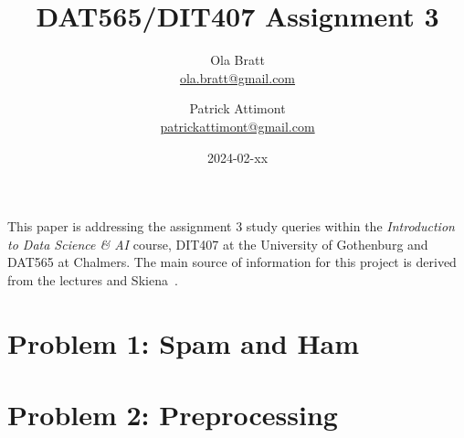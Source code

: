 \documentclass[a4paper]{article}
\begin{document}
\author{Ola Bratt \\
  \href{mailto:ola.bratt@gmail.com}{ola.bratt@gmail.com}
  \and
  Patrick Attimont \\
  \href{patrickattimont@gmail.com}{patrickattimont@gmail.com}
}

\title{DAT565/DIT407 Assignment 3}
\date{2024-02-xx}

\maketitle

This paper is addressing the assignment 3 study queries within the \emph{Introduction to Data Science \& AI} course, DIT407 at 
the University of Gothenburg and DAT565 at Chalmers. The main source of information for this project
is derived from the lectures and Skiena~\cite{Skiena:2024}. 

\section*{Problem 1: Spam and Ham}

\section*{Problem 2: Preprocessing}
\end{document}

